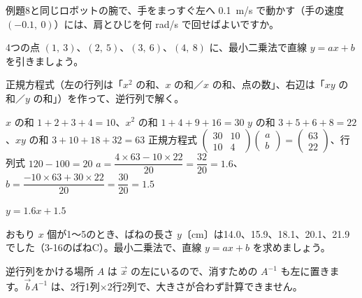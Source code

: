 \begin{jibun}
例題8と同じロボットの腕で、手をまっすぐ左へ \qty{0.1}{m/s} で動かす（手の速度 $(-0.1,\ 0)$）には、肩とひじを何 rad/s で回せばよいですか。
\end{jibun}

\begin{reidai}[最小二乗法で直線を引く]
4つの点 $(1,\ 3)$、$(2,\ 5)$、$(3,\ 6)$、$(4,\ 8)$ に、最小二乗法で直線 $y=ax+b$ を引きましょう。\par
\kangaekata 正規方程式（左の行列は「$x^2$ の和、$x$ の和／$x$ の和、点の数」、右辺は「$xy$ の和／$y$ の和」）を作って、逆行列で解く。\par
\shiki $x$ の和 $1+2+3+4=10$、$x^2$ の和 $1+4+9+16=30$\kviifq
$y$ の和 $3+5+6+8=22$、$xy$ の和 $3+10+18+32=63$\kviifq
正規方程式 $\begin{pmatrix}30&10\\10&4\end{pmatrix}\begin{pmatrix}a\\b\end{pmatrix}=\begin{pmatrix}63\\22\end{pmatrix}$、行列式 $120-100=20$\kviifq
$a=\dfrac{4\times63-10\times22}{20}=\dfrac{32}{20}=1.6$、$b=\dfrac{-10\times63+30\times22}{20}=\dfrac{30}{20}=1.5$\par
\kotae $y=1.6x+1.5$
\end{reidai}

\begin{jibun}
おもり $x$ 個が1〜5のとき、ばねの長さ $y$〔cm〕は14.0、15.9、18.1、20.1、21.9でした（3-16のばねC）。最小二乗法で、直線 $y=ax+b$ を求めましょう。
\end{jibun}


\begin{tsumazuki}{逆行列をかける場所}
$A$ は $\vec x$ の左にいるので、消すための $A^{-1}$ も左に置きます。$\vec bA^{-1}$ は、2行1列×2行2列で、大きさが合わず計算できません。
\end{tsumazuki}

